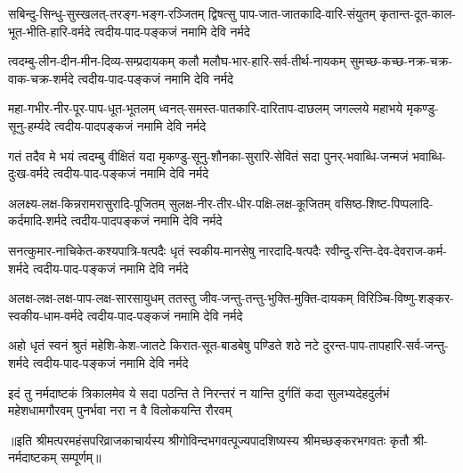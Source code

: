
\fourlineindentedshloka
{सबिन्दु-सिन्धु-सुस्खलत्-तरङ्ग-भङ्ग-रञ्जितम्}
{द्विषत्सु पाप-जात-जातकादि-वारि-संयुतम्}
{कृतान्त-दूत-काल-भूत-भीति-हारि-वर्मदे}
{त्वदीय-पाद-पङ्कजं नमामि देवि नर्मदे} %

\fourlineindentedshloka
{त्वदम्बु-लीन-दीन-मीन-दिव्य-सम्प्रदायकम्}
{कलौ मलौघ-भार-हारि-सर्व-तीर्थ-नायकम्}
{सुमच्छ-कच्छ-नक्र-चक्र-वाक-चक्र-शर्मदे}
{त्वदीय-पाद-पङ्कजं नमामि देवि नर्मदे} %

\fourlineindentedshloka
{महा-गभीर-नीर-पूर-पाप-धूत-भूतलम्}
{ध्वनत्-समस्त-पातकारि-दारिताप-दाछलम्}
{जगल्लये महाभये मृकण्डु-सूनु-हर्म्यदे}
{त्वदीय-पादपङ्कजं नमामि देवि नर्मदे} %

\fourlineindentedshloka
{गतं तदैव मे भयं त्वदम्बु वीक्षितं यदा}
{मृकण्डु-सूनु-शौनका-सुरारि-सेवितं सदा}
{पुनर्-भवाब्धि-जन्मजं भवाब्धि-दुःख-वर्मदे}
{त्वदीय-पाद-पङ्कजं नमामि देवि नर्मदे} %

\fourlineindentedshloka
{अलक्ष्य-लक्ष-किन्नरामरासुरादि-पूजितम्}
{सुलक्ष-नीर-तीर-धीर-पक्षि-लक्ष-कूजितम्}
{वसिष्ठ-शिष्ट-पिप्पलादि-कर्दमादि-शर्मदे}
{त्वदीय-पादपङ्कजं नमामि देवि नर्मदे} %

\fourlineindentedshloka
{सनत्कुमार-नाचिकेत-कश्यपात्रि-षत्पदैः}
{धृतं स्वकीय-मानसेषु नारदादि-षत्पदैः}
{रवीन्दु-रन्ति-देव-देवराज-कर्म-शर्मदे}
{त्वदीय-पाद-पङ्कजं नमामि देवि नर्मदे} %

\fourlineindentedshloka
{अलक्ष-लक्ष-लक्ष-पाप-लक्ष-सारसायुधम्}
{ततस्तु जीव-जन्तु-तन्तु-भुक्ति-मुक्ति-दायकम्}
{विरिञ्चि-विष्णु-शङ्कर-स्वकीय-धाम-वर्मदे}
{त्वदीय-पाद-पङ्कजं नमामि देवि नर्मदे} %

\fourlineindentedshloka
{अहो धृतं स्वनं श्रुतं महेशि-केश-जातटे}
{किरात-सूत-बाडबेषु पण्डिते शठे नटे}
{दुरन्त-पाप-तापहारि-सर्व-जन्तु-शर्मदे}
{त्वदीय-पाद-पङ्कजं नमामि देवि नर्मदे} %

\fourlineindentedshloka
{इदं तु नर्मदाष्टकं त्रिकालमेव ये सदा}
{पठन्ति ते निरन्तरं न यान्ति दुर्गतिं कदा}
{सुलभ्यदेहदुर्लभं महेशधामगौरवम्}
{पुनर्भवा नरा न वै विलोकयन्ति रौरवम्} %

॥इति श्रीमत्परमहंसपरिव्राजकाचार्यस्य श्रीगोविन्दभगवत्पूज्यपादशिष्यस्य 
श्रीमच्छङ्करभगवतः कृतौ श्री-नर्मदाष्टकम् सम्पूर्णम्॥